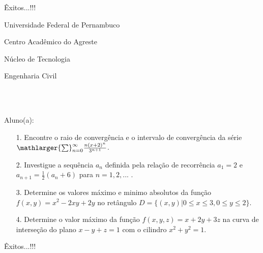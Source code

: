 \documentclass[oneside,a4paper,12pt]{article}
\newcommand{\universidade}{Universidade Federal de Pernambuco}
\newcommand{\centro}{Centro Acadêmico do Agreste}
\newcommand{\departamento}{Núcleo de Tecnologia}
\newcommand{\curso}{Engenharia Civil}
\begin{document}
	\flushbottom
	\flushright
     Êxitos...!!!
     \begin{center}
     	\vspace{0pt}
     	
     	\universidade
     	\par
     	\centro
     	\par
     	\departamento
     	\par
     	\curso
     	\par
     	\vspace{08pt}
     	\\ \\
     \end{center}
     
     \begin{flushleft}
     	Aluno(a):
     \end{flushleft}
 
\begin{itemize}
	\item[1.]  Encontre o raio de convergência e o intervalo de convergência da série $\mathlarger{\sum}_{n=0}^{\infty} \frac{n(x+2)^{n}}{3^{n+1}}$.
\end{itemize}
\begin{itemize}
	\item[2.] Investigue a sequência ${a_{n}}$ definida pela relação de recorrência $a_{1}=2$ e $a_{n+1}=\frac{1}{2}(a_{n}+6)$ para $n=1,2,...$  . 
\end{itemize}
\begin{itemize}
	\item [3.] Determine os valores máximo e minimo absolutos da função $f(x,y)=x^{2}-2xy+2y$ no retângulo $D=\{(x,y)| 0\leq x \leq 3, 0\leq y \leq 2\}$.
\end{itemize}
\begin{itemize}
	\item[4.] Determine o valor máximo da função $f(x,y,z)=x+2y+3z$ na curva de interseção do plano $x-y+z=1$ com o cilindro $x^{2}+y^{2}=1$.
\end{itemize}
\flushbottom
\flushright
Êxitos...!!!
\end{document}
